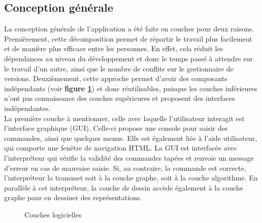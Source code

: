 \documentclass[french]{article}
\begin{document}
		\subsection{Conception générale}
		La conception générale de l'application a été faite en couches pour deux raisons. Premièrement, cette décomposition permet de répartir le travail plus facilement et de manière plus efficace entre les personnes. En effet, cela réduit les dépendances au niveau du développement et donc le temps passé à attendre sur le travail d'un autre, ainsi que le nombre de conflits sur le gestionnaire de versions. Deuxièmement, cette approche permet d'avoir des composants indépendants (voir \textbf{figure \ref{couchesLogicielles}}) et donc réutilisables, puisque les couches inférieures n'ont pas connaissance des couches supérieures et proposent des interfaces indépendantes.\\
		La première couche à mentionner, celle avec laquelle l'utilisateur interagit est l'interface graphique (GUI). Celle-ci propose une console pour saisir des commandes, ainsi que quelques menus. Elle est également liée à l'aide utilisateur, qui comporte une fenêtre de navigation HTML. La GUI est interfacée avec l'interpréteur qui vérifie la validité des commandes tapées et renvoie un message d'erreur en cas de mauvaise saisie. Si, au contraire, la commande est correcte, l'interpréteur la transmet soit à la couche graphe, soit à la couche algorithme. En parallèle à cet interpréteur, la couche de dessin accède également à la couche graphe pour en dessiner des représentations.
		
		\begin{figure}[H]
			\centering
			\caption{Couches logicielles}
			\label{couchesLogicielles}
		\end{figure}
		
\end{document}
